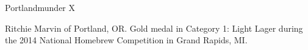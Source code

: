 \begin{recipe}{Portlandmunder X} %

\begin{aboutblock}
Ritchie Marvin of Portland, OR. Gold medal in Category 1: Light Lager during the
2014 National Homebrew Competition in Grand Rapids, MI.
\sourceaha
\end{aboutblock}


\begin{methodandtiming}

\begin{mashsteps}
\end{mashsteps}

\begin{fermentationsteps}
\end{fermentationsteps}

\end{methodandtiming}

\recipebreak

\begin{ingredientsblock}

\begin{malts}
\end{malts}

\begin{hops}
\end{hops}


\end{ingredientsblock}

\end{recipe}
